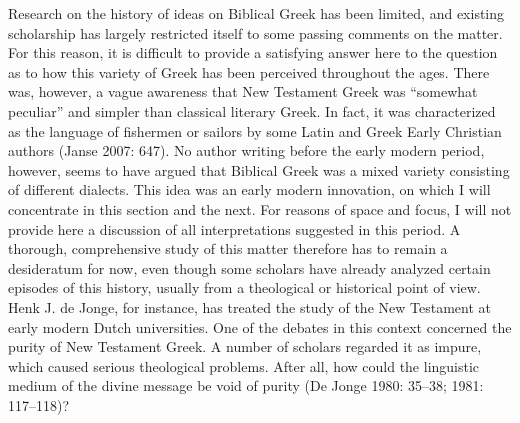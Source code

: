 \begin{styleStandard}
Research on the history of ideas on Biblical Greek has been limited, and existing scholarship has largely restricted itself to some passing comments on the matter. For this reason, it is difficult to provide a satisfying answer here to the question as to how this variety of Greek has been perceived throughout the ages. There was, however, a vague awareness that New Testament Greek was “somewhat peculiar” and simpler than classical literary Greek. In fact, it was characterized as the language of fishermen or sailors by some Latin and Greek Early Christian authors (Janse 2007: 647). No author writing before the early modern period, however, seems to have argued that Biblical Greek was a mixed variety consisting of different dialects. This idea was an early modern innovation, on which I will concentrate in this section and the next. For reasons of space and focus, I will not provide here a discussion of all interpretations suggested in this period. A thorough, comprehensive study of this matter therefore has to remain a desideratum for now, even though some scholars have already analyzed certain episodes of this history, usually from a theological or historical point of view. Henk J. de Jonge, for instance, has treated the study of the New Testament at early modern Dutch universities. One of the debates in this context concerned the purity of New Testament Greek. A number of scholars regarded it as impure, which caused serious theological problems. After all, how could the linguistic medium of the divine message be void of purity (De Jonge 1980: 35–38; 1981: 117–118)?
\end{styleStandard}

